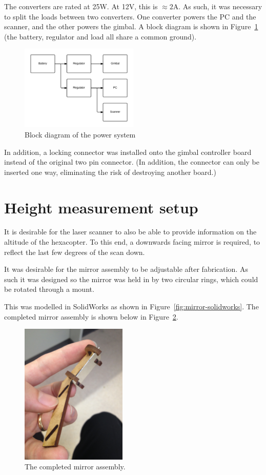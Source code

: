 \documentclass[12pt,oneside,a4paper]{book}
\begin{document}
The converters are rated at 25W. At 12V, this is $\approx 2$A. As
such, it was necessary to split the loads between two converters. One
converter powers the PC and the scanner, and the other powers the
gimbal. A block diagram is shown in Figure~\ref{fig:power} (the
battery, regulator and load all share a common ground).

\begin{figure}[h!]
  \centering
  \includegraphics[width=0.5\textwidth]{figs/power}
  \caption{Block diagram of the power system}
  \label{fig:power}
\end{figure}

In addition, a locking connector was installed onto the gimbal
controller board instead of the original two pin connector. (In
addition, the connector can only be inserted one way, eliminating the
risk of destroying another board.)

\section{Height measurement setup}
\label{sec:height-meas-setup}

It is desirable for the laser scanner to also be able to provide
information on the altitude of the hexacopter. To this end, a
downwards facing mirror is required, to reflect the last few degrees
of the scan down.

It was desirable for the mirror assembly to be adjustable after
fabrication. As such it was designed so the mirror was held in by two
circular rings, which could be rotated through a mount.

This was modelled in SolidWorks as shown in
Figure~\ref{fig:mirror-solidworks}. The completed mirror assembly is shown below in
Figure~\ref{fig:mirror}.

\begin{figure}[h]
  \centering
  \includegraphics[width=0.45\textwidth]{figs/mirror}
  \caption{The completed mirror assembly.}
  \label{fig:mirror}
\end{figure}
\end{document}
